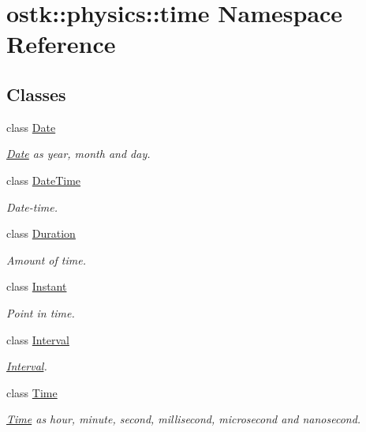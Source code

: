 \hypertarget{namespaceostk_1_1physics_1_1time}{}\section{ostk\+:\+:physics\+:\+:time Namespace Reference}
\label{namespaceostk_1_1physics_1_1time}
\subsection*{Classes}
\begin{DoxyCompactItemize}
\item 
class \hyperlink{classostk_1_1physics_1_1time_1_1_date}{Date}
\begin{DoxyCompactList}\small\item\em \hyperlink{classostk_1_1physics_1_1time_1_1_date}{Date} as year, month and day. \end{DoxyCompactList}\item 
class \hyperlink{classostk_1_1physics_1_1time_1_1_date_time}{Date\+Time}
\begin{DoxyCompactList}\small\item\em Date-\/time. \end{DoxyCompactList}\item 
class \hyperlink{classostk_1_1physics_1_1time_1_1_duration}{Duration}
\begin{DoxyCompactList}\small\item\em Amount of time. \end{DoxyCompactList}\item 
class \hyperlink{classostk_1_1physics_1_1time_1_1_instant}{Instant}
\begin{DoxyCompactList}\small\item\em Point in time. \end{DoxyCompactList}\item 
class \hyperlink{classostk_1_1physics_1_1time_1_1_interval}{Interval}
\begin{DoxyCompactList}\small\item\em \hyperlink{classostk_1_1physics_1_1time_1_1_interval}{Interval}. \end{DoxyCompactList}\item 
class \hyperlink{classostk_1_1physics_1_1time_1_1_time}{Time}
\begin{DoxyCompactList}\small\item\em \hyperlink{classostk_1_1physics_1_1time_1_1_time}{Time} as hour, minute, second, millisecond, microsecond and nanosecond. \end{DoxyCompactList}\end{DoxyCompactItemize}

